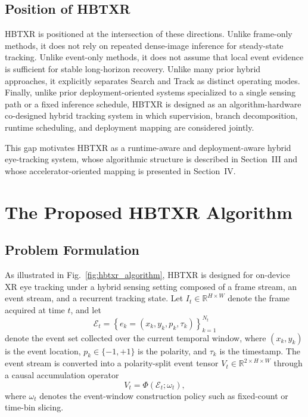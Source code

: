 ﻿\documentclass[journal]{IEEEtran}
\begin{document}
\subsection{Position of HBTXR}

HBTXR is positioned at the intersection of these directions. Unlike frame-only methods, it does not rely on repeated dense-image inference for steady-state tracking. Unlike event-only methods, it does not assume that local event evidence is sufficient for stable long-horizon recovery. Unlike many prior hybrid approaches, it explicitly separates Search and Track as distinct operating modes. Finally, unlike prior deployment-oriented systems specialized to a single sensing path or a fixed inference schedule, HBTXR is designed as an algorithm-hardware co-designed hybrid tracking system in which supervision, branch decomposition, runtime scheduling, and deployment mapping are considered jointly.

This gap motivates HBTXR as a runtime-aware and deployment-aware hybrid eye-tracking system, whose algorithmic structure is described in Section~III and whose accelerator-oriented mapping is presented in Section~IV.

\section{The Proposed HBTXR Algorithm}

\subsection{Problem Formulation}

As illustrated in Fig.~\ref{fig:hbtxr_algorithm}, HBTXR is designed for on-device XR eye tracking under a hybrid sensing setting composed of a frame stream, an event stream, and a recurrent tracking state. Let \(I_t \in \mathbb{R}^{H \times W}\) denote the frame acquired at time \(t\), and let
\begin{equation}
\mathcal{E}_t = \left\{ e_k = (x_k, y_k, p_k, \tau_k) \right\}_{k=1}^{N_t}
\label{eq:event_stream}
\end{equation}
denote the event set collected over the current temporal window, where \((x_k,y_k)\) is the event location, \(p_k \in \{-1,+1\}\) is the polarity, and \(\tau_k\) is the timestamp. The event stream is converted into a polarity-split event tensor \(V_t \in \mathbb{R}^{2 \times H \times W}\) through a causal accumulation operator
\begin{equation}
V_t = \Phi(\mathcal{E}_t; \omega_t),
\label{eq:event_tensor}
\end{equation}
where \(\omega_t\) denotes the event-window construction policy such as fixed-count or time-bin slicing.
\end{document}
